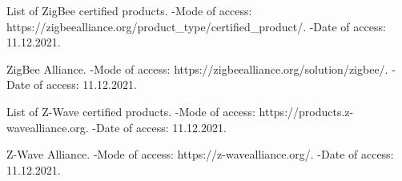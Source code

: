 \newpage
 	
	 \begin{thebibliography}{1}
	 	
	 	 List of ZigBee certified products. -Mode of access: 
	 	\newline https://zigbeealliance.org/product\_type/certified\_product/. -Date of access: 11.12.2021.
	 	
	 	 ZigBee Alliance. -Mode of access: 
	 	\newline https://zigbeealliance.org/solution/zigbee/. -Date of access: 11.12.2021.
	 	
	 	 List of Z-Wave certified products. -Mode of access: 
	 	\newline https://products.z-wavealliance.org. -Date of access: 11.12.2021.
	 	
	 	 Z-Wave Alliance. -Mode of access: 
	 	\newline https://z-wavealliance.org/. -Date of access: 11.12.2021.
	 	
	 \end{thebibliography}
